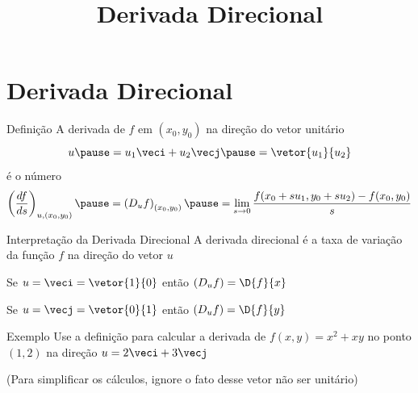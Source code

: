 
\usepackage{calculo_varias_variaveis-1}

\title {Derivada Direcional}



\addtitle

\section{Derivada Direcional}


\begin{frame}{Definição}
  A derivada de $f$ em $(x_0, y_0)$
  \pause
  na direção do vetor unitário
  \[
    u
    \pause
    = u_1 \veci + u_2 \vecj
    \pause
    = \vetor{u_1}{u_2}
  \]
  \pause
  é o número
  \[
    \left(\frac{df}{ds}\right)_{u, (x_0, y_0)}
    \pause
    = \left(D_u f\right)_{(x_0, y_0)}
    \pause
    = \lim_{s\to 0} \frac{f(x_0+su_1, y_0+su_2)-f(x_0, y_0)}{s}
  \]
\end{frame}



\begin{frame}{Interpretação da Derivada Direcional}
  A derivada direcional é a taxa de variação da função $f$ na direção do vetor $u$

  \pause
  \vspace{\baselineskip}
  Se \(u=\veci=\vetor{1}{0}\)
  \pause
  então
  \(
    \left(D_u f\right) = \D{f}{x}
  \)

  \pause
  \vspace{\baselineskip}
  Se \(u=\vecj=\vetor{0}{1}\)
  \pause
  então
  \(
    \left(D_u f\right) = \D{f}{y}
  \)
\end{frame}

\addtocounter{exemplo}{1}
\begin{frame}{Exemplo \theexemplo}
  Use a definição para calcular a derivada de \(f(x, y) = x^2 + xy\)
  no ponto \((1, 2)\) na direção
  \(
    u = 2\veci + 3\vecj
  \)

  \vspace{2\baselineskip}
  (Para simplificar os cálculos, ignore o fato desse vetor não ser unitário)
\end{frame}

